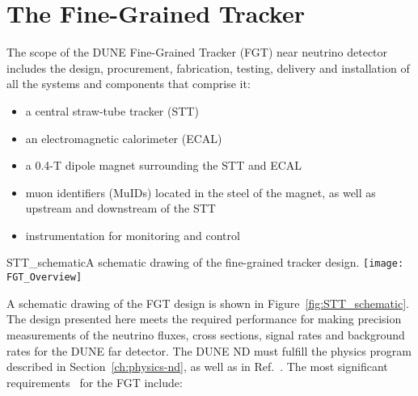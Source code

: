 \section{The Fine-Grained Tracker} 
\label{cdrsec:detectors-nd-ref-fgt}

The scope of the DUNE Fine-Grained Tracker (FGT) near neutrino detector includes the design, procurement, fabrication, testing, delivery and installation of all the systems and components that comprise it:


\begin{itemize}
\item a central straw-tube tracker (STT)
\item an electromagnetic calorimeter (ECAL) 
\item a 0.4-T dipole magnet surrounding the STT and ECAL
\item muon identifiers (MuIDs) located in the steel of the magnet, as well as upstream and downstream of the STT
\item instrumentation for monitoring and control
\end{itemize}



\begin{cdrfigure}{STT_schematic}{A schematic drawing of the fine-grained tracker design.}
\texttt{[image: FGT\_Overview]}
\end{cdrfigure}

A schematic drawing of the FGT design is shown in Figure~\ref{fig:STT_schematic}. 
The design presented here meets the required performance for making precision measurements of the 
neutrino fluxes, cross sections, signal rates and background rates for the DUNE far detector. 
The DUNE ND must fulfill the physics program described in Section~\ref{ch:physics-nd}, as well 
as in Ref.~\cite{DPR}. The most significant requirements~\cite{ND-REQ1,ND-REQ2} for the FGT include:  

